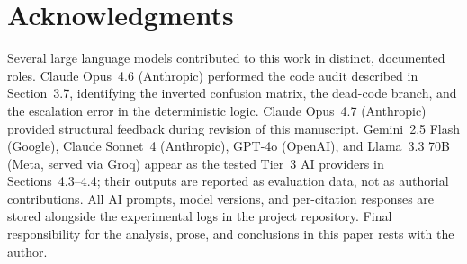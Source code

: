 \section*{Acknowledgments}

Several large language models contributed to this work in distinct, documented roles. Claude Opus~4.6 (Anthropic) performed the code audit described in Section~3.7, identifying the inverted confusion matrix, the dead-code branch, and the escalation error in the deterministic logic. Claude Opus~4.7 (Anthropic) provided structural feedback during revision of this manuscript. Gemini~2.5 Flash (Google), Claude Sonnet~4 (Anthropic), GPT-4o (OpenAI), and Llama~3.3 70B (Meta, served via Groq) appear as the tested Tier~3 AI providers in Sections~4.3--4.4; their outputs are reported as evaluation data, not as authorial contributions. All AI prompts, model versions, and per-citation responses are stored alongside the experimental logs in the project repository. Final responsibility for the analysis, prose, and conclusions in this paper rests with the author.
